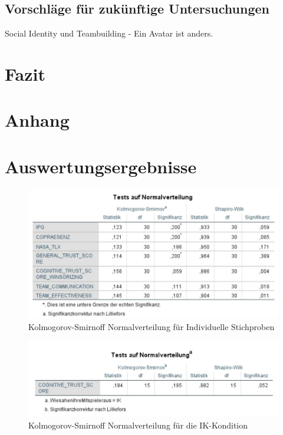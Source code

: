 \documentclass[a4paper,11pt]{article}%
\renewcommand{\\}{\vspace*{0.5\baselineskip} \newline}
\begin{document}
	\subsection{Vorschläge für zukünftige Untersuchungen}
		Social Identity und Teambuilding - Ein Avatar ist anders.
	
\section{Fazit}
\newpage




	\newpage
	\appendix	
\section*{Anhang}

\section{Auswertungsergebnisse}
	
	\begin{figure}[H]
	\centering
		\begin{footnotesize}
			\includegraphics[scale=0.6]{Abbildungen/Post_QuestionnaireStatistiks/Normalverteilung_30}
			
			\caption{Kolmogorov-Smirnoff Normalverteilung für Individuelle Stichproben}
			\label{fig:KolSmirInd}
		\end{footnotesize}
	\end{figure}	
	
	\begin{figure}[H]
	\centering
		\begin{footnotesize}
			\includegraphics[scale=0.6]{Abbildungen/Post_QuestionnaireStatistiks/Normalverteilung_15_IK}
			
			\caption{Kolmogorov-Smirnoff Normalverteilung für die IK-Kondition}
			\label{fig:KolSmirIndIK}
		\end{footnotesize}
	\end{figure}	
	
\end{document}
